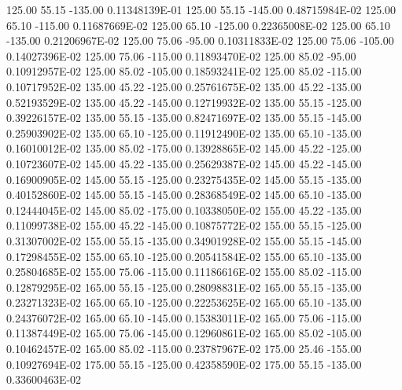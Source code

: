     125.00      55.15    -135.00      0.11348139E-01
     125.00      55.15    -145.00      0.48715984E-02
     125.00      65.10    -115.00      0.11687669E-02
     125.00      65.10    -125.00      0.22365008E-02
     125.00      65.10    -135.00      0.21206967E-02
     125.00      75.06     -95.00      0.10311833E-02
     125.00      75.06    -105.00      0.14027396E-02
     125.00      75.06    -115.00      0.11893470E-02
     125.00      85.02     -95.00      0.10912957E-02
     125.00      85.02    -105.00      0.18593241E-02
     125.00      85.02    -115.00      0.10717952E-02
     135.00      45.22    -125.00      0.25761675E-02
     135.00      45.22    -135.00      0.52193529E-02
     135.00      45.22    -145.00      0.12719932E-02
     135.00      55.15    -125.00      0.39226157E-02
     135.00      55.15    -135.00      0.82471697E-02
     135.00      55.15    -145.00      0.25903902E-02
     135.00      65.10    -125.00      0.11912490E-02
     135.00      65.10    -135.00      0.16010012E-02
     135.00      85.02    -175.00      0.13928865E-02
     145.00      45.22    -125.00      0.10723607E-02
     145.00      45.22    -135.00      0.25629387E-02
     145.00      45.22    -145.00      0.16900905E-02
     145.00      55.15    -125.00      0.23275435E-02
     145.00      55.15    -135.00      0.40152860E-02
     145.00      55.15    -145.00      0.28368549E-02
     145.00      65.10    -135.00      0.12444045E-02
     145.00      85.02    -175.00      0.10338050E-02
     155.00      45.22    -135.00      0.11099738E-02
     155.00      45.22    -145.00      0.10875772E-02
     155.00      55.15    -125.00      0.31307002E-02
     155.00      55.15    -135.00      0.34901928E-02
     155.00      55.15    -145.00      0.17298455E-02
     155.00      65.10    -125.00      0.20541584E-02
     155.00      65.10    -135.00      0.25804685E-02
     155.00      75.06    -115.00      0.11186616E-02
     155.00      85.02    -115.00      0.12879295E-02
     165.00      55.15    -125.00      0.28098831E-02
     165.00      55.15    -135.00      0.23271323E-02
     165.00      65.10    -125.00      0.22253625E-02
     165.00      65.10    -135.00      0.24376072E-02
     165.00      65.10    -145.00      0.15383011E-02
     165.00      75.06    -115.00      0.11387449E-02
     165.00      75.06    -145.00      0.12960861E-02
     165.00      85.02    -105.00      0.10462457E-02
     165.00      85.02    -115.00      0.23787967E-02
     175.00      25.46    -155.00      0.10927694E-02
     175.00      55.15    -125.00      0.42358590E-02
     175.00      55.15    -135.00      0.33600463E-02
